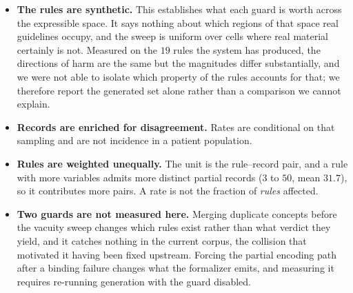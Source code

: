 \begin{itemize}\itemsep2pt
  \item \textbf{The rules are synthetic.} This establishes what each guard is
        worth across the expressible space. It says nothing about which regions
        of that space real guidelines occupy, and the sweep is uniform over
        cells where real material certainly is not. Measured on the $19$ rules
        the system has produced, the directions of harm are the same but the
        magnitudes differ substantially, and we were not able to isolate which
        property of the rules accounts for that; we therefore report the
        generated set alone rather than a comparison we cannot explain.
  \item \textbf{Records are enriched for disagreement.} Rates are conditional
        on that sampling and are not incidence in a patient population.
  \item \textbf{Rules are weighted unequally.} The unit is the rule--record
        pair, and a rule with more variables admits more distinct partial
        records ($3$ to $50$, mean $31.7$), so it contributes more pairs. A
        rate is not the fraction of \emph{rules} affected.
  \item \textbf{Two guards are not measured here.} Merging duplicate concepts
        before the vacuity sweep changes which rules exist rather than what
        verdict they yield, and it catches nothing in the current corpus, the
        collision that motivated it having been fixed upstream. Forcing the
        partial encoding path after a binding failure changes what the
        formalizer emits, and measuring it requires re-running generation with
        the guard disabled.
\end{itemize}
